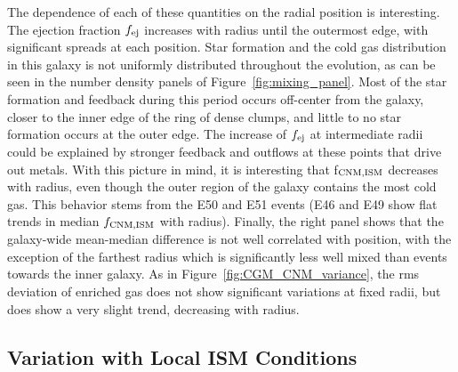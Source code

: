 \documentclass[twocolumn]{aastex62}
\begin{document}
The dependence of each of these quantities on the radial position is interesting. The ejection fraction $f_{\rm ej}$ increases with radius until the outermost edge, with significant spreads at each position. Star formation and the cold gas distribution in this galaxy is not uniformly distributed throughout the evolution, as can be seen in the number density panels of Figure~\ref{fig:mixing_panel}. Most of the star formation and feedback during this period occurs off-center from the galaxy, closer to the inner edge of the ring of dense clumps, and little to no star formation occurs at the outer edge. The increase of $f_{\rm ej}$ at intermediate radii could be explained by stronger feedback and outflows at these points that drive out metals. With this picture in mind, it is interesting that f$_{\rm CNM, ISM}$ decreases with radius, even though the outer region of the galaxy contains the most cold gas. This behavior stems from the E50 and E51 events (E46 and E49 show flat trends in median $f_{\rm CNM, ISM}$ with radius). 
Finally, the right panel shows that the galaxy-wide mean-median difference is not well correlated with position, with the exception of the farthest radius which is significantly less well mixed than events towards the inner galaxy. As in Figure~\ref{fig:CGM_CNM_variance}, the rms deviation of enriched gas does not show significant variations at fixed radii, but does show a very slight trend, decreasing with radius.

\subsection{Variation with Local ISM Conditions}
\label{sec:ISM density}
\end{document}

